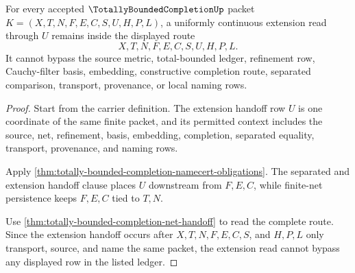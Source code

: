 \begin{theorem}
\label{thm:totally-bounded-completion-extension-nonescape}
For every accepted $\TotallyBoundedCompletionUp$ packet $K=(X,T,N,F,E,C,S,U,H,P,L)$, a uniformly continuous extension read through $U$ remains inside the displayed route
$$
X,T,N,F,E,C,S,U,H,P,L .
$$
It cannot bypass the source metric, total-bounded ledger, refinement row, Cauchy-filter basis, embedding, constructive completion route, separated comparison, transport, provenance, or local naming rows.
\end{theorem}
\begin{proof}
Start from the carrier definition. The extension handoff row $U$ is one coordinate of the same finite packet, and its permitted context includes the source, net, refinement, basis, embedding, completion, separated equality, transport, provenance, and naming rows.

Apply \autoref{thm:totally-bounded-completion-namecert-obligations}. The separated and extension handoff clause places $U$ downstream from $F,E,C$, while finite-net persistence keeps $F,E,C$ tied to $T,N$.

Use \autoref{thm:totally-bounded-completion-net-handoff} to read the complete route. Since the extension handoff occurs after $X,T,N,F,E,C,S$, and $H,P,L$ only transport, source, and name the same packet, the extension read cannot bypass any displayed row in the listed ledger.
\end{proof}

